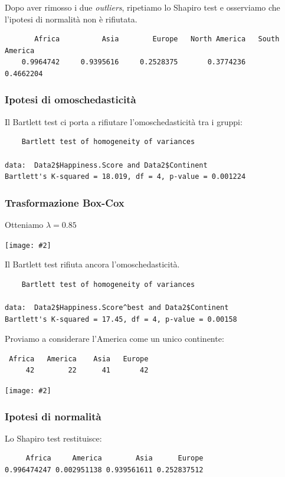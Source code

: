 \documentclass{beamer}
\newcommand{\fg}[2]{%
  \begin{center}
      \texttt{[image: \#2]}%
  \end{center}
}
\begin{document}
\begin{frame}[fragile]
    Dopo aver rimosso i due \textit{outliers}, ripetiamo lo Shapiro test e osserviamo che l'ipotesi di normalità non è rifiutata.

    \tiny
    \begin{verbatim}
       Africa          Asia        Europe   North America   South America 
    0.9964742     0.9395616     0.2528375       0.3774236       0.4662204 
    \end{verbatim}
\end{frame}

\begin{frame}[fragile]
    \frametitle{Ipotesi di omoschedasticità}

    Il Bartlett test ci porta a rifiutare l'omoschedasticità tra i gruppi:

    \tiny
    \begin{verbatim}
    Bartlett test of homogeneity of variances

data:  Data2$Happiness.Score and Data2$Continent
Bartlett's K-squared = 18.019, df = 4, p-value = 0.001224
    \end{verbatim}
\end{frame}

\begin{frame}
	\frametitle{Trasformazione Box-Cox}
	Otteniamo $\lambda = 0.85$
    \fg{0.75}{cox11}
\end{frame}

\begin{frame}[fragile]
	Il Bartlett test rifiuta ancora l'omoschedasticità.
	{\tiny
	\begin{verbatim}
    Bartlett test of homogeneity of variances

data:  Data2$Happiness.Score^best and Data2$Continent
Bartlett's K-squared = 17.45, df = 4, p-value = 0.00158
	\end{verbatim}
	}
\end{frame}

\begin{frame}[fragile]
    Proviamo a considerare l'America come un unico continente:
    \tiny
    \begin{verbatim}
 Africa   America    Asia   Europe  
     42        22      41       42 
    \end{verbatim}

    \fg{0.5}{box22}
\end{frame}

\begin{frame}[fragile]
    \frametitle{Ipotesi di normalità}
    Lo Shapiro test restituisce:
    \tiny
    \begin{verbatim}
     Africa     America        Asia      Europe 
0.996474247 0.002951138 0.939561611 0.252837512
    \end{verbatim}
\end{frame}
\end{document}
